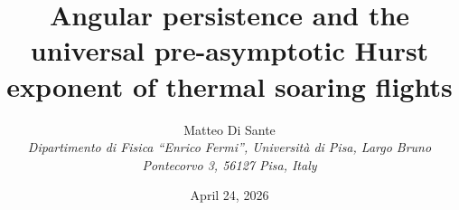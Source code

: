 \documentclass[11pt,a4paper]{article}
\begin{document}
\title{Angular persistence and the universal pre-asymptotic
       Hurst exponent of thermal soaring flights}

\author{Matteo Di Sante\\[2pt]
\small\itshape Dipartimento di Fisica ``Enrico Fermi'',
Universit\`a di Pisa, Largo Bruno Pontecorvo 3, 56127 Pisa, Italy\normalfont}

\date{April 24, 2026}

\renewenvironment{abstract}{\small\begin{quote}\textbf{Abstract.} }{\end{quote}\normalsize}

\maketitle
\end{document}
